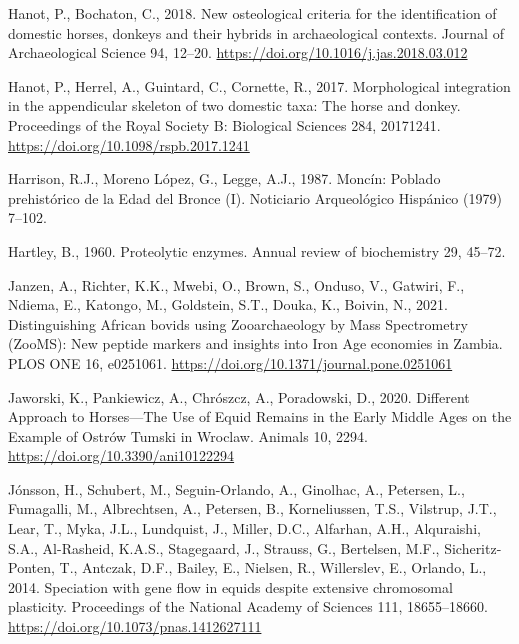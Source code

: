 \documentclass[preprint, 3p, authoryear]{elsarticle} %
\newlength{\cslhangindent}
\newlength{\cslentryspacingunit} %
\newenvironment{CSLReferences}[2] %
 {%
  \setlength{\parindent}{0pt}
  \ifodd #1
  \let\oldpar\par
  \def\par{\hangindent=\cslhangindent\oldpar}
  \fi
  \setlength{\parskip}{#2\cslentryspacingunit}
 }%
 {}
\begin{document}
\begin{CSLReferences}{1}{0}
\leavevmode{}%
Hanot, P., Bochaton, C., 2018. New osteological criteria for the identification of domestic horses, donkeys and their hybrids in archaeological contexts. Journal of Archaeological Science 94, 12--20. \url{https://doi.org/10.1016/j.jas.2018.03.012}

\leavevmode{}%
Hanot, P., Herrel, A., Guintard, C., Cornette, R., 2017. Morphological integration in the appendicular skeleton of two domestic taxa: The horse and donkey. Proceedings of the Royal Society B: Biological Sciences 284, 20171241. \url{https://doi.org/10.1098/rspb.2017.1241}

\leavevmode{}%
Harrison, R.J., Moreno López, G., Legge, A.J., 1987. Moncín: Poblado prehistórico de la {Edad} del {Bronce} ({I}). Noticiario Arqueológico Hispánico (1979) 7--102.

\leavevmode{}%
Hartley, B., 1960. Proteolytic enzymes. Annual review of biochemistry 29, 45--72.

\leavevmode{}%
Janzen, A., Richter, K.K., Mwebi, O., Brown, S., Onduso, V., Gatwiri, F., Ndiema, E., Katongo, M., Goldstein, S.T., Douka, K., Boivin, N., 2021. Distinguishing {African} bovids using {Zooarchaeology} by {Mass Spectrometry} ({ZooMS}): {New} peptide markers and insights into {Iron Age} economies in {Zambia}. PLOS ONE 16, e0251061. \url{https://doi.org/10.1371/journal.pone.0251061}

\leavevmode{}%
Jaworski, K., Pankiewicz, A., Chrószcz, A., Poradowski, D., 2020. Different {Approach} to {Horses}---{The Use} of {Equid Remains} in the {Early Middle Ages} on the {Example} of {Ostrów Tumski} in {Wroclaw}. Animals 10, 2294. \url{https://doi.org/10.3390/ani10122294}

\leavevmode{}%
Jónsson, H., Schubert, M., Seguin-Orlando, A., Ginolhac, A., Petersen, L., Fumagalli, M., Albrechtsen, A., Petersen, B., Korneliussen, T.S., Vilstrup, J.T., Lear, T., Myka, J.L., Lundquist, J., Miller, D.C., Alfarhan, A.H., Alquraishi, S.A., Al-Rasheid, K.A.S., Stagegaard, J., Strauss, G., Bertelsen, M.F., Sicheritz-Ponten, T., Antczak, D.F., Bailey, E., Nielsen, R., Willerslev, E., Orlando, L., 2014. Speciation with gene flow in equids despite extensive chromosomal plasticity. Proceedings of the National Academy of Sciences 111, 18655--18660. \url{https://doi.org/10.1073/pnas.1412627111}


\end{CSLReferences}
\end{document}
